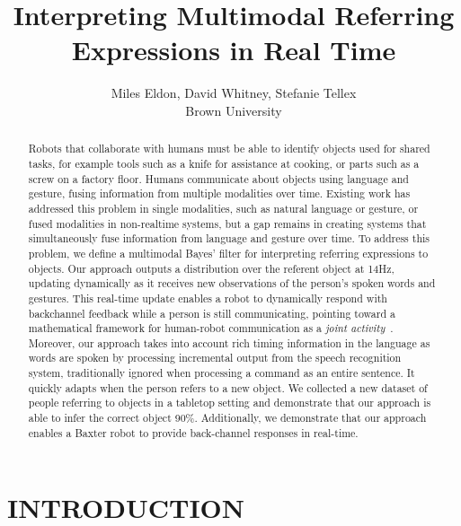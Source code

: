 \documentclass[letterpaper, 10 pt, conference]{ieeeconf}
\title{\LARGE \bf
Interpreting Multimodal Referring Expressions in Real Time}
\author{Miles Eldon, David Whitney, Stefanie Tellex\\Brown University}
\begin{document}
\maketitle
\thispagestyle{empty}
\pagestyle{empty}

\begin{abstract}
Robots that collaborate with humans must be able to identify objects
used for shared tasks, for example tools such as a knife for
assistance at cooking, or parts such as a screw on a factory floor.
Humans communicate about objects using language and gesture, fusing
information from multiple modalities over time.  Existing work has
addressed this problem in single modalities, such as natural language
or gesture, or fused modalities in non-realtime systems, but a gap
remains in creating systems that simultaneously fuse information from
language and gesture over time.  To address this problem, we define a
multimodal Bayes' filter for interpreting referring expressions to
objects.  Our approach outputs a distribution over the referent object
at 14Hz, updating dynamically as it receives new observations of the
person's spoken words and gestures.  This real-time update enables a
robot to dynamically respond with backchannel feedback while a person
is still communicating, pointing toward a mathematical framework for
human-robot communication as a {\em joint activity}~\citep{clark96}.
Moreover, our approach takes into account rich timing information in
the language as words are spoken by processing incremental output from
the speech recognition system, traditionally ignored when processing a
command as an entire sentence.  It quickly adapts when the person
refers to a new object.  We collected a new dataset of people
referring to objects in a tabletop setting and demonstrate that our
approach is able to infer the correct object 90\%.  Additionally, we
demonstrate that our approach enables a Baxter robot to provide
back-channel responses in real-time.
\end{abstract}

\section{INTRODUCTION}
\end{document}
